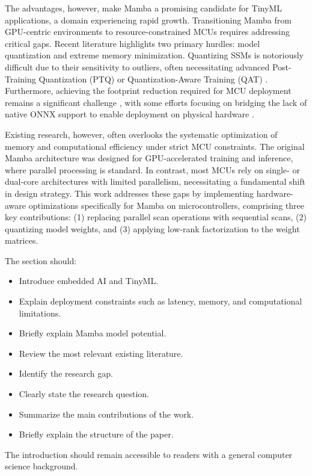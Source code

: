 The advantages, however, make Mamba a promising candidate for TinyML applications, a domain experiencing rapid growth. Transitioning Mamba from GPU-centric environments to resource-constrained MCUs requires addressing critical gaps. Recent literature highlights two primary hurdles: model quantization and extreme memory minimization. Quantizing SSMs is notoriously difficult due to their sensitivity to outliers, often necessitating advanced Post-Training Quantization (PTQ) \cite{xuMambaQuantQuantizingMamba2025} or Quantization-Aware Training (QAT) \cite{tegonFEMBAEdgePhysiologicallyAware2026a}. Furthermore, achieving the footprint reduction required for MCU deployment remains a significant challenge \cite{suwannaphongOptimisingTinyMLQuantization2025a}, with some efforts focusing on bridging the lack of native ONNX support to enable deployment on physical hardware \cite{xuMambaLiteMicroMemoryOptimizedMamba2025}.

Existing research, however, often overlooks the systematic optimization of memory and computational efficiency under strict MCU constraints. The original Mamba architecture was designed for GPU-accelerated training and inference, where parallel processing is standard. In contrast, most MCUs rely on single- or dual-core architectures with limited parallelism, necessitating a fundamental shift in design strategy. This work addresses these gaps by implementing hardware-aware optimizations specifically for Mamba on microcontrollers, comprising three key contributions: (1) replacing parallel scan operations with sequential scans, (2) quantizing model weights, and (3) applying low-rank factorization to the weight matrices.

The section should:
\begin{itemize}
  \item Introduce embedded AI and TinyML.
  \item Explain deployment constraints such as latency, memory, and computational limitations.
  \item Briefly explain Mamba model potential.
  \item Review the most relevant existing literature.
  \item Identify the research gap.
  \item Clearly state the research question.
  \item Summarize the main contributions of the work.
  \item Briefly explain the structure of the paper.
\end{itemize}

The introduction should remain accessible to readers with a general computer science background.

